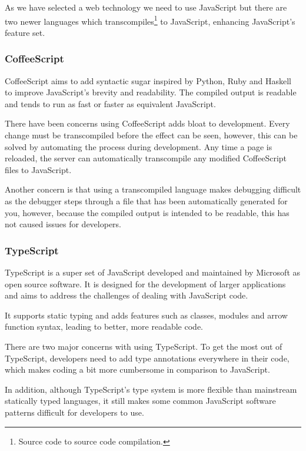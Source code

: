 \documentclass[11pt, a4paper, twoside]{report}
\begin{document}
As we have selected a web technology we need to use JavaScript but there are two newer languages which transcompiles\footnote{Source code to source code compilation.} to JavaScript, enhancing JavaScript's feature set.

\subsubsection{CoffeeScript}

CoffeeScript aims to add syntactic sugar inspired by Python, Ruby and Haskell to improve JavaScript's brevity and readability. \citep{maccaw2012little} The compiled output is readable and tends to run as fast or faster as equivalent JavaScript. \citep{coffeescript2017faq}

There have been concerns using CoffeeScript adds bloat to development. Every change must be transcompiled before the effect can be seen, however, this can be solved by automating the process during development. Any time a page is reloaded, the server can automatically transcompile any modified CoffeeScript files to JavaScript. \citep{wheeler2017coffeescript}

Another concern is that using a transcompiled language makes debugging difficult as the debugger steps through a file that has been automatically generated for you, however, because the compiled output is intended to be readable, this has not caused issues for developers. \citep{wheeler2017coffeescript}

\subsubsection{TypeScript} \label{sec:typescript}

TypeScript is a super set of JavaScript developed and maintained by Microsoft as open source software. It is designed for the development of larger applications and aims to address the challenges of dealing with JavaScript code.

It supports static typing and adds features such as classes, modules and arrow function syntax, leading to better, more readable code. \citep{typescript2017site}

There are two major concerns with using TypeScript. To get the most out of TypeScript, developers need to add type annotations everywhere in their code, which makes coding a bit more cumbersome in comparison to JavaScript.

In addition, although TypeScript's type system is more flexible than mainstream statically typed languages, it still makes some common JavaScript software patterns difficult for developers to use. \citep{dataart2017site}
\end{document}
